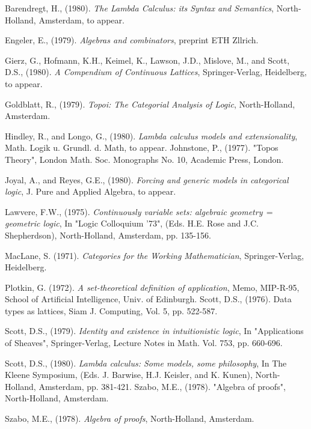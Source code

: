 \begin{thebibliography}{86}

 Barendregt, H., (1980). {\it The Lambda Calculus: its Syntax and Semantics}, North-Holland, Amsterdam, to appear.

 Engeler, E., (1979).  {\it Algebras and combinators}, preprint ETH Zllrich.

 Gierz, G., Hofmann, K.H., Keimel, K., Lawson, J.D., Mislove, M., and Scott, D.S., (1980). {\it A Compendium of Continuous Lattices}, Springer-Verlag, Heidelberg, to appear.

 Goldblatt, R., (1979). {\it Topoi: The Categorial Analysis of Logic}, North-Holland, Amsterdam.

 Hindley, R., and Longo, G., (1980). {\it Lambda calculus models and extensionality}, Math. Logik u. Grundl. d. Math, to appear.
Johnstone, P., (1977). "Topos Theory", London Math. Soc.
Monographs No. 10, Academic Press, London.

 Joyal, A., and Reyes, G.E., (1980). {\it Forcing and generic models in categorical logic}, J. Pure and Applied Algebra, to appear.

 Lawvere, F.W., (1975). {\it Continuously variable sets: algebraic geometry$\,=\,$geometric logic}, In "Logic Colloquium '73", (Eds. H.E. Rose and J.C. Shepherdson), North-Holland, Amsterdam, pp. 135-156.

 MacLane, S. (1971). {\it Categories for the Working Mathematician}, Springer-Verlag, Heidelberg.

 Plotkin, G. (1972). {\it A set-theoretical definition of application}, Memo, MIP-R-95, School of Artificial Intelligence, Univ. of Edinburgh.
Scott, D.S., (1976). Data types as lattices, Siam J. Computing,
Vol. 5, pp. 522-587.

 Scott, D.S., (1979). {\it Identity and existence in intuitionistic logic}, In "Applications of Sheaves", Springer-Verlag, Lecture Notes in Math. Vol. 753, pp. 660-696.

 Scott, D.S., (1980). {\it Lambda calculus: Some models, some philosophy}, In The Kleene Symposium, (Eds. J. Barwise,
H.J. Keisler, and K. Kunen), North-Holland, Amsterdam, pp. 381-421.
Szabo, M.E., (1978). "Algebra of proofs", North-Holland, Amsterdam.

 Szabo, M.E., (1978). {\it Algebra of proofs}, North-Holland, Amsterdam.

\end{thebibliography}